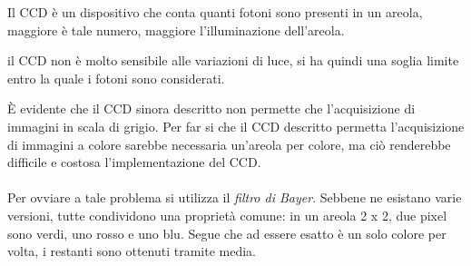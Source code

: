 \documentclass{subfiles}
\begin{document}
Il CCD è un dispositivo che conta quanti fotoni sono presenti in un areola, maggiore è tale numero, maggiore l'illuminazione dell'areola.

\begin{Remark*}
    il CCD non è molto sensibile alle variazioni di luce, si ha quindi una soglia limite entro la quale i fotoni sono considerati.
\end{Remark*}

\`E evidente che il CCD sinora descritto non permette che l'acquisizione di immagini in scala di grigio.
Per far si che il CCD descritto permetta l'acquisizione di immagini a colore sarebbe necessaria un'areola per colore,
ma ciò renderebbe difficile e costosa l'implementazione del CCD.
\\ \\
Per ovviare a tale problema si utilizza il \emph{filtro di Bayer}.
Sebbene ne esistano varie versioni, tutte condividono una proprietà comune: in un areola 2 x 2, due pixel sono verdi, uno rosso e uno blu.
Segue che ad essere esatto è un solo colore per volta, i restanti sono ottenuti tramite media.
\end{document}
